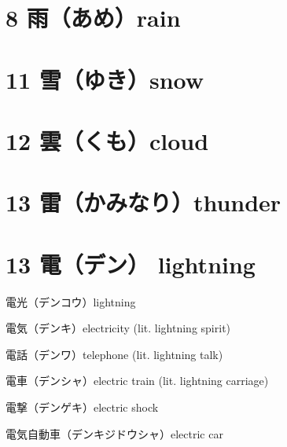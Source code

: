 \section{8 雨（あめ）rain}

\section{11 雪（ゆき）snow}

\section{12 雲（くも）cloud}

\section{13 雷（かみなり）thunder}

\section{13 電（デン） lightning}

電光（デンコウ）lightning

電気（デンキ）electricity (lit. lightning spirit)

電話（デンワ）telephone (lit. lightning talk)

電車（デンシャ）electric train (lit. lightning carriage)

電撃（デンゲキ）electric shock

電気自動車（デンキジドウシャ）electric car
